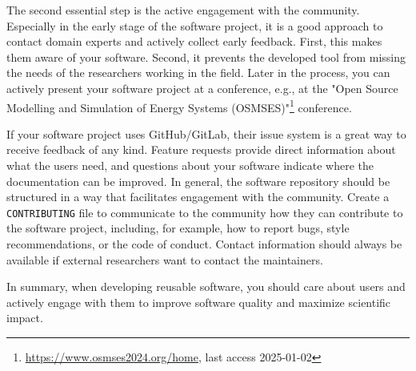 \par 
The second essential step is the active engagement with the community.
Especially in the early stage of the software project, it is a good approach to contact domain experts and actively collect early feedback. First, this makes them aware of your software. Second, it prevents the developed tool from missing the needs of the researchers working in the field. Later in the process, you can actively present your software project at a conference, e.g., at the "Open Source Modelling and Simulation of Energy Systems (OSMSES)"\footnote{\url{https://www.osmses2024.org/home}, last access 2025-01-02} conference. 
\par 
If your software project uses GitHub/GitLab, their issue system is a great way to receive feedback of any kind. Feature requests provide direct information about what the users need, and questions about your software indicate where the documentation can be improved. 
In general, the software repository should be structured in a way that facilitates engagement with the community. Create a \texttt{CONTRIBUTING} file to communicate to the community how they can contribute to the software project, including, for example, how to report bugs, style recommendations, or the code of conduct.
Contact information should always be available if external researchers want to contact the maintainers. 

\par 
In summary, when developing reusable software, you should care about users and actively engage with them to improve software quality and maximize scientific impact.  

